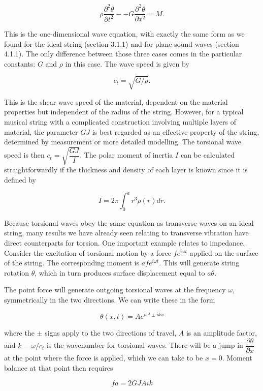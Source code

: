   $$\rho \dfrac{\partial^2 \theta}{\partial t^2} -- G \dfrac{\partial^2 
  \theta}{\partial x^2}= M . \tag{4}$$ 

  This is the one-dimensional wave equation, with exactly the same form as we 
  found for the ideal string (section 3.1.1) and for plane sound waves (section 
  4.1.1). The only difference between those three cases comes in the particular 
  constants: $G$ and $\rho$ in this case. The wave speed is given by 

  $$c_t=\sqrt{G/\rho}. \tag{5}$$ 

  This is the shear wave speed of the material, dependent on the material 
  properties but independent of the radius of the string. However, for a 
  typical musical string with a complicated construction involving multiple 
  layers of material, the parameter $GJ$ is best regarded as an effective 
  property of the string, determined by measurement or more detailed modelling. 
  The torsional wave speed is then $c_t=\sqrt{\dfrac{GJ}{I}}$. The polar moment 
  of inertia $I$ can be calculated straightforwardly if the thickness and 
  density of each layer is known since it is defined by 

  $$I= 2 \pi \int_0^a{r^3 \rho(r) dr} . \tag{6}$$ 

  Because torsional waves obey the same equation as transverse waves on an 
  ideal string, many results we have already seen relating to transverse 
  vibration have direct counterparts for torsion. One important example relates 
  to impedance. Consider the excitation of torsional motion by a force $fe^{i 
  \omega t}$ applied on the surface of the string. The corresponding moment is 
  $afe^{i \omega t}$. This will generate string rotation $\theta$, which in 
  turn produces surface displacement equal to $a \theta$. 

  The point force will generate outgoing torsional waves at the frequency 
  $\omega$, symmetrically in the two directions. We can write these in the form 

  $$\theta(x,t)= A e^{i \omega t \pm i k x} \tag{7}$$ 

  where the $\pm$ signs apply to the two directions of travel, $A$ is an 
  amplitude factor, and $k=\omega /c_t$ is the wavenumber for torsional waves. 
  There will be a jump in $\dfrac{\partial \theta}{\partial x}$ at the point 
  where the force is applied, which we can take to be $x=0$. Moment balance at 
  that point then requires 

  $$fa=2 G J A i k \tag{8}$$ 

